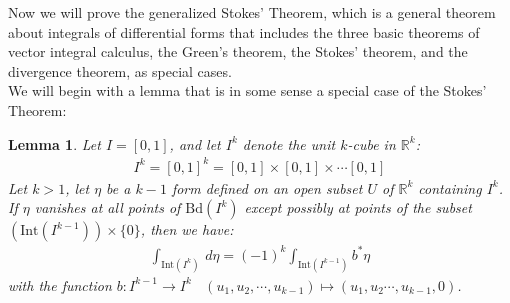 \documentclass[15pt]{book}
\theoremstyle{break}
\theoremstyle{break}
\newtheorem{lem}{Lemma}[thm]
\newcommand{\R}{\mathbb{R}}
\newcommand{\Int}{\text{Int}}
\newcommand{\Bd}{\text{Bd}}
\begin{document}
\hfill\break\hfill\break\hfill\break

Now we will prove the generalized Stokes' Theorem, which is a general theorem about integrals of differential forms that includes the three basic theorems of vector integral calculus, the Green's theorem, the Stokes' theorem, and the divergence theorem, as special cases.\\

We will begin with a lemma that is in some sense a special case of the Stokes' Theorem:

\begin{lem}
Let $I = [0,1]$, and let $I^k$ denote the unit $k$-cube in $\R^k$:
\begin{align*}
I^k = [0,1]^k = [0,1]\times [0,1]\times \cdots [0,1]
\end{align*}
Let $k>1$, let $\eta$ be a $k-1$ form defined on an open subset $U$ of $\R^k$ containing $I^k$. If $\eta$ vanishes at all points of $\Bd(I^k)$ except possibly at points of the subset $(\Int(I^{k-1}))\times \{0\}$, then we have:
\begin{align*}
\int_{\Int(I^k)}\, d\eta = (-1)^{k} \int_{\Int(I^{k-1})} b^*\eta \tag{*}
\end{align*}
with the function $b:I^{k-1} \to I^k \ \ \ \ (u_1,u_2,\cdots, u_{k-1}) \mapsto (u_1,u_2\cdots, u_{k-1},0)$. 
\end{lem}
\end{document}
